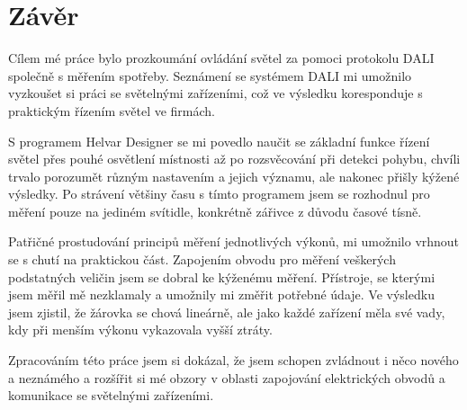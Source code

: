 \documentclass[FM,RP]{tulthesis}
\begin{document}
  
   \chapter{Závěr}
      Cílem mé práce bylo prozkoumání ovládání světel za pomoci protokolu DALI společně s měřením spotřeby. Seznámení se systémem DALI mi umožnilo vyzkoušet si práci se světelnými zařízeními, což ve výsledku koresponduje s praktickým řízením světel ve firmách.
      
      
      S programem Helvar Designer se mi povedlo naučit se základní funkce řízení světel přes pouhé osvětlení místnosti až po rozsvěcování při detekci pohybu, chvíli trvalo porozumět různým nastavením a jejich významu, ale nakonec přišly kýžené výsledky. Po strávení většiny času s tímto programem jsem se rozhodnul pro měření pouze na jediném svítidle, konkrétně zářivce z důvodu časové tísně.
           
      Patřičné prostudování principů měření jednotlivých výkonů, mi umožnilo vrhnout se s chutí na praktickou část. Zapojením obvodu pro měření veškerých podstatných veličin jsem se dobral ke kýženému měření. Přístroje, se kterými jsem měřil mě nezklamaly a umožnily mi změřit potřebné údaje. Ve výsledku jsem zjistil, že žárovka se chová lineárně, ale jako každé zařízení měla své vady, kdy při menším výkonu vykazovala vyšší ztráty. 
       
      Zpracováním této práce jsem si dokázal, že jsem schopen zvládnout i něco nového a neznámého a rozšířit si mé obzory v oblasti zapojování elektrických obvodů a komunikace se světelnými zařízeními.
      
      
      
      
      
   
  
  
  


\end{document}
